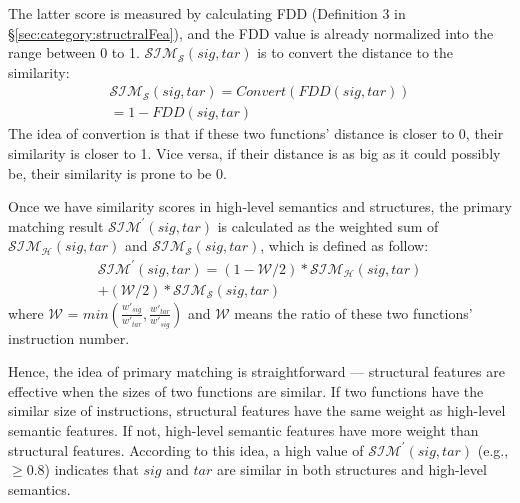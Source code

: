 The latter score is measured by calculating FDD (Definition 3 in \S\ref{sec:category:structralFea}), and the FDD value is already normalized into  the range between 0 to 1. $\mathcal{SIM_{S}}(sig, tar)$ is to convert the distance to the similarity:
\begin{equation}
\begin{aligned}
 \mathcal{SIM_{S}}(sig, tar) = Convert(FDD(sig, tar)) \\
 = 1 - FDD(sig, tar)%
\end{aligned}
\end{equation}
The idea of convertion is that if these two functions' distance is closer to 0, their similarity is closer to 1. Vice versa, if their distance is as big as it could possibly be, their similarity is prone to be 0.

Once we have similarity scores in high-level semantics and structures, the primary matching result $\mathcal{SIM^\prime}(sig, tar)$ is calculated as the weighted sum of $\mathcal{SIM_{H}}(sig, tar)$ and $\mathcal{SIM_{S}}(sig, tar)$, which is defined as follow:
\begin{equation}
\begin{aligned}
 \mathcal{SIM^\prime}(sig, tar) =  (1 - \mathcal{W}/2) *  \mathcal{SIM_{H}}(sig, tar)  \\
  + ( \mathcal{W}/2) * \mathcal{SIM_{S}}(sig, tar)
\end{aligned}
\end{equation}
where $\mathcal{W}$ = $min(\frac{w'_{sig}}{ w'_{tar}}, \frac{w'_{tar}}{ w'_{sig}})$ and $\mathcal{W}$ means the ratio of these two functions' instruction number.

Hence, the idea of primary matching is straightforward --- structural features are effective when the sizes of two functions are similar. If two functions have the similar size of instructions, structural features have the same weight as high-level semantic features. If not, high-level semantic features have more weight than structural features. According to this idea, a high value of $\mathcal{SIM^\prime}(sig, tar)$ (e.g., $\geq 0.8$) indicates that $sig$ and $tar$ are similar in both structures and high-level semantics.

